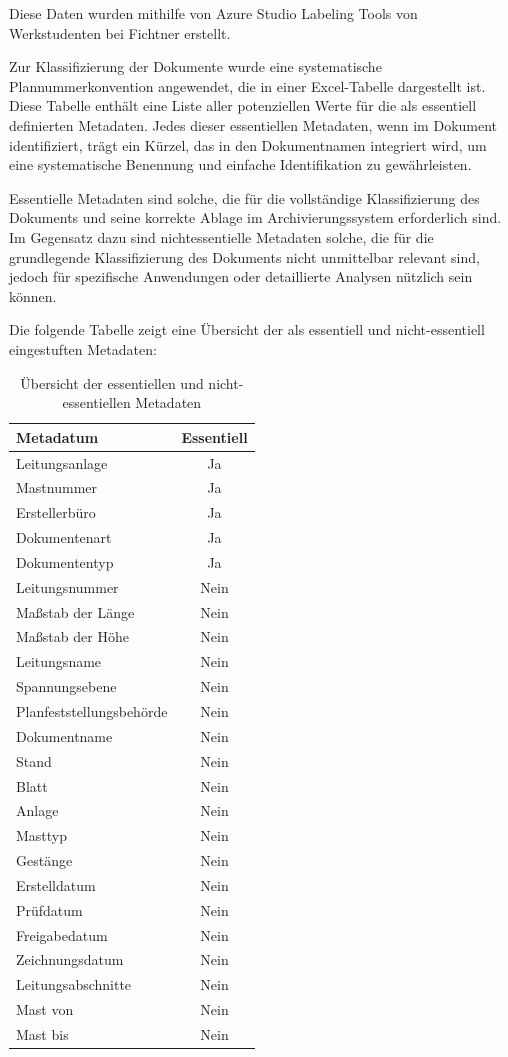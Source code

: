 \documentclass[12pt,a4paper,twoside]{article}
\begin{document}
Diese Daten wurden mithilfe von Azure Studio Labeling Tools von Werkstudenten bei Fichtner erstellt.

Zur Klassifizierung der Dokumente wurde eine systematische Plannummerkonvention angewendet, die in einer Excel-Tabelle dargestellt ist. Diese Tabelle enthält eine Liste aller potenziellen Werte für die als essentiell definierten Metadaten. Jedes dieser essentiellen Metadaten, wenn im Dokument identifiziert, trägt ein Kürzel, das in den Dokumentnamen integriert wird, um eine systematische Benennung und einfache Identifikation zu gewährleisten.

Essentielle Metadaten sind solche, die für die vollständige Klassifizierung des Dokuments und seine korrekte Ablage im Archivierungssystem erforderlich sind. Im Gegensatz dazu sind nichtessentielle Metadaten solche, die für die grundlegende Klassifizierung des Dokuments nicht unmittelbar relevant sind, jedoch für spezifische Anwendungen oder detaillierte Analysen nützlich sein können.

Die folgende Tabelle zeigt eine Übersicht der als essentiell und nicht-essentiell eingestuften Metadaten:
\begin{table}[H]
\centering
\begin{tabular}{|l|c|}
\hline
\textbf{Metadatum} & \textbf{Essentiell} \\
\hline
Leitungsanlage & Ja \\
Mastnummer & Ja \\
Erstellerbüro & Ja \\
Dokumentenart & Ja \\
Dokumententyp & Ja \\
Leitungsnummer & Nein \\
Maßstab der Länge & Nein \\
Maßstab der Höhe & Nein \\
Leitungsname & Nein \\
Spannungsebene & Nein \\
Planfeststellungsbehörde & Nein \\
Dokumentname & Nein \\
Stand & Nein \\
Blatt & Nein \\
Anlage & Nein \\
Masttyp & Nein \\
Gestänge & Nein \\
Erstelldatum & Nein \\
Prüfdatum & Nein \\
Freigabedatum & Nein \\
Zeichnungsdatum & Nein \\
Leitungsabschnitte & Nein \\
Mast von & Nein \\
Mast bis & Nein \\
\hline
\end{tabular}
\caption{Übersicht der essentiellen und nicht-essentiellen Metadaten}
\label{tab:metadata_classification}
\end{table}
\end{document}
